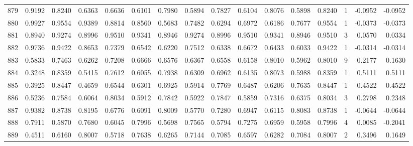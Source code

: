 \begin{tabular}{lrrrrrrrrrrrrrrr}
879 &      0.9192 &  0.8240 &  0.6363 &  0.6636 &  0.6101 &  0.7980 &  0.5894 &  0.7827 &  0.6104 &  0.8076 &   0.5898 &     0.8240 &      1 &                   -0.0952 &                    -0.0952 \\
880 &      0.9927 &  0.9554 &  0.9389 &  0.8814 &  0.8560 &  0.5683 &  0.7482 &  0.6294 &  0.6972 &  0.6186 &   0.7677 &     0.9554 &      1 &                   -0.0373 &                    -0.0373 \\
881 &      0.8940 &  0.9274 &  0.8996 &  0.9510 &  0.9341 &  0.8946 &  0.9274 &  0.8996 &  0.9510 &  0.9341 &   0.8946 &     0.9510 &      3 &                    0.0570 &                     0.0334 \\
882 &      0.9736 &  0.9422 &  0.8653 &  0.7379 &  0.6542 &  0.6220 &  0.7512 &  0.6338 &  0.6672 &  0.6433 &   0.6033 &     0.9422 &      1 &                   -0.0314 &                    -0.0314 \\
883 &      0.5833 &  0.7463 &  0.6262 &  0.7208 &  0.6666 &  0.6576 &  0.6367 &  0.6558 &  0.6158 &  0.8010 &   0.5962 &     0.8010 &      9 &                    0.2177 &                     0.1630 \\
884 &      0.3248 &  0.8359 &  0.5415 &  0.7612 &  0.6055 &  0.7938 &  0.6309 &  0.6962 &  0.6135 &  0.8073 &   0.5988 &     0.8359 &      1 &                    0.5111 &                     0.5111 \\
885 &      0.3925 &  0.8447 &  0.4659 &  0.6544 &  0.6301 &  0.6925 &  0.5914 &  0.7769 &  0.6487 &  0.6206 &   0.7635 &     0.8447 &      1 &                    0.4522 &                     0.4522 \\
886 &      0.5236 &  0.7584 &  0.6064 &  0.8034 &  0.5912 &  0.7842 &  0.5922 &  0.7847 &  0.5859 &  0.7316 &   0.6375 &     0.8034 &      3 &                    0.2798 &                     0.2348 \\
887 &      0.9382 &  0.8738 &  0.8195 &  0.6776 &  0.6091 &  0.8009 &  0.5770 &  0.7280 &  0.6947 &  0.6115 &   0.8083 &     0.8738 &      1 &                   -0.0644 &                    -0.0644 \\
888 &      0.7911 &  0.5870 &  0.7680 &  0.6045 &  0.7996 &  0.5698 &  0.7565 &  0.5794 &  0.7275 &  0.6959 &   0.5958 &     0.7996 &      4 &                    0.0085 &                    -0.2041 \\
889 &      0.4511 &  0.6160 &  0.8007 &  0.5718 &  0.7638 &  0.6265 &  0.7144 &  0.7085 &  0.6597 &  0.6282 &   0.7084 &     0.8007 &      2 &                    0.3496 &                     0.1649 \\

\end{tabular}
